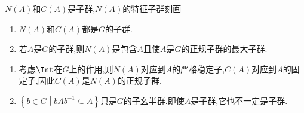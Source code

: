\begin{proposition}{$N\left(A\right)$和$C\left(A\right)$是子群,$N\left(A\right)$的特征子群刻画}{}
	\begin{enumerate}
		\item $N\left(A\right)$和$C\left(A\right)$都是$G$的子群.
		\item 若$A$是$G$的子群,则$N\left(A\right)$是包含$A$且使$A$是$G$的正规子群的最大子群.
	\end{enumerate}
\end{proposition}

\begin{remark}{}{}
	\begin{enumerate}
		\item 考虑$\Int$在$G$上的作用,则$N\left(A\right)$对应到$A$的严格稳定子,$C\left(A\right)$对应到$A$的固定子,因此$C\left(A\right)$是$N\left(A\right)$的正规子群.
		\item $\left\{b\in G\middle|bAb^{-1}\subseteq A\right\}$只是$G$的子幺半群.即使$A$是子群,它也不一定是子群.
	\end{enumerate}
\end{remark}
































